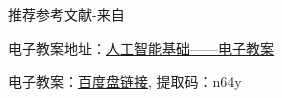 \begin{overview}
\thispagestyle{empty}
%
%


推荐参考文献-来自

电子教案地址：\href{https://github.com/zggl/AITeachingPlanDraft2020/}{人工智能基础——电子教案}

电子教案：\href{https://pan.baidu.com/s/1HrXEH2aWqq5LFSMkfw4teQ}{百度盘链接}, 提取码：n64y
\end{overview}
